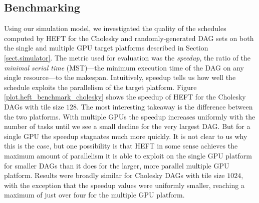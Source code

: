 \documentclass[runningheads]{llncs}
\begin{document}
\subsection{Benchmarking}
\label{subsect.benchmarking}

Using our simulation model, we investigated the quality of the schedules computed by HEFT for the Cholesky and randomly-generated DAG sets on both the single and multiple GPU target platforms described in Section \ref{sect.simulator}. The metric used for evaluation was the {\em speedup}, the ratio of the {\em minimal serial time} (MST)---the minimum execution time of the DAG on any single resource---to the makespan. Intuitively, speedup tells us how well the schedule exploits the parallelism of the target platform. Figure \ref{plot.heft_benchmark_cholesky} shows the speedup of HEFT for the Cholesky DAGs with tile size $128$. The most interesting takeaway is the difference between the two platforms. With multiple GPUs the speedup increases uniformly with the number of tasks until we see a small decline for the very largest DAG. But for a single GPU the speedup stagnates much more quickly. It is not clear to us why this is the case, but one possibility is that HEFT in some sense achieves the maximum amount of parallelism it is able to exploit on the single GPU platform for smaller DAGs than it does for the larger, more parallel multiple GPU platform. Results were broadly similar for Cholesky DAGs with tile size $1024$, with the exception that the speedup values were uniformly smaller, reaching a maximum of just over four for the multiple GPU platform. 
\end{document}
